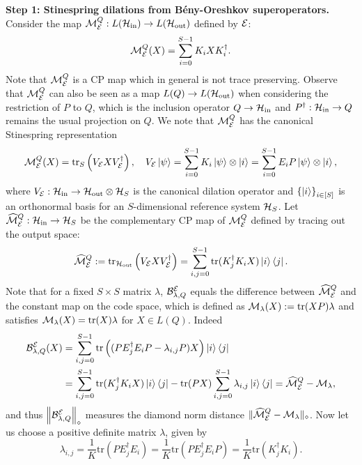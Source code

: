 \documentclass[10pt]{article}
\newcommand{\SIN}{\mathrm{in}}
\newcommand{\SOUT}{\mathrm{out}}
\newcommand{\tr}{\mathrm{tr}}
\newcommand{\p}[1]{\left(#1\right)}
\newcommand{\ppp}[1]{\left\{#1\right\}}
\newcommand{\norm}[1]{\left\|#1\right\|}
\begin{document}
\noindent\textbf{Step 1: Stinespring dilations from B\'eny-Oreshkov superoperators.}
Consider the map $\calM^Q_{\calE}:L(\calH_{\SIN})\to L(\calH_{\SOUT})$ defined by ${\cal E}$: 
\[{\cal M}^Q_{{\cal E}}(X)=\sum_{i=0}^{S-1}K_i X K_i^\dag.\]
Note that ${\cal M}^Q_{{\cal E}}$ is a CP map which in general is not trace preserving. Observe that ${\cal M}_{{\cal E}}^Q$ can also be seen as a map $L(Q)\to L(\calH_{\SOUT})$ when considering the restriction of $P$ to $Q$, which is the inclusion operator $Q\to \calH_{\SIN}$ and $P^\dag:\calH_{\SIN}\to Q$ remains the usual projection on $Q$. We note that ${\cal M}^Q_{{\cal E}}$ has the canonical Stinespring representation
\begin{equation}
    \calM^Q_{\calE}(X)=\tr_{S}\p{V_{\calE} X V_{\calE}^\dag}, \quad V_{\calE}\ket{\psi}=\sum_{i=0}^{S-1}K_i\ket{\psi} \otimes \ket{i}=\sum_{i=0}^{S-1}E_iP\ket{\psi} \otimes \ket{i},\label{eq:VcalEdef}
\end{equation}
where $V_{\calE}:\calH_{\SIN}\to \calH_{\SOUT}\otimes \calH_S$ is the canonical dilation operator
and  $\ppp{\ket{i}}_{i\in [S]}$ is an orthonormal basis for an $S$-dimensional reference system  ${\cal H}_S$. Let $\widehat{\calM}^Q_{\calE}:\calH_{\SIN}\to \calH_{S}$ be the complementary CP map of ${\cal M}^Q_{{\cal E}}$ defined by tracing out the output space:
\[\widehat{\calM}^Q_{\calE}:= \tr_{{\calH_{\SOUT}}}\p{V_{\calE} X V_{\calE}^\dag}=\sum_{i,j=0}^{S-1}\tr(K_j^\dag K_i X) \ket{i}\bra{j}.\]
Note that for a fixed $S\times S$ matrix $\lambda$, ${\cal B}_{\lambda,Q}^{{\cal E}}$ equals the difference  between $\widehat{{\cal M}}^Q_{{\cal E}}$ and the constant map on the code space, which is defined as $\calM_{\lambda}(X):=\tr(XP)\lambda$ and satisfies $\calM_{\lambda}(X)=\tr(X)\lambda$ for $X\in L(Q)$. Indeed
\begin{align*}
    \calB_{\lambda,Q}^{\calE}(X)&=\sum_{i,j=0}^{S-1}\tr\p{(PE_j^\dag E_iP -\lambda_{i,j}P)X}\ket{i}\bra{j}
    \\
    &=\sum_{i,j=0}^{S-1}\tr(K_j^\dag K_i X) \ket{i}\bra{j}-\tr(P X) \sum_{i,j=0}^{S-1}\lambda_{i,j}\ket{i}\bra{j}=\widehat{\calM}^Q_{\calE}-\calM_{\lambda},
\end{align*}
and thus $\norm{\calB_{\lambda,Q}^{\calE}}_{\diamond}$ measures the diamond norm distance $\|\widehat{{\cal M}}^Q_{{\cal E}}-{\cal M}_{\lambda}\|_\diamond$. Now let us choose a positive definite matrix $\lambda$, given by 
\begin{equation}
    \lambda_{i,j}=\frac{1}{K}\tr(PE_j^\dag E_i)=\frac{1}{K}\tr(PE_j^\dag E_iP)=\frac{1}{K}\tr(K_j^\dag K_i).\label{eq:lambdaDef}
\end{equation}
\end{document}
